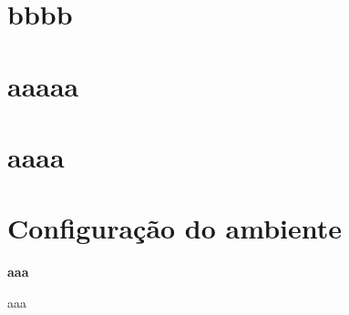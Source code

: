 
\captionsbrazil
\chapter{bbbb}

\chapter{aaaaa}

\chapter{aaaa}


\chapter{Configuração do ambiente}

\noindent \textbf{aaa}

\par aaa

